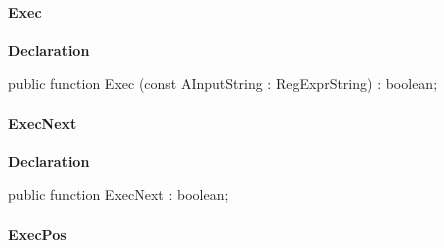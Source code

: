 \documentclass{report}
\newif\ifpdf
\begin{document}
\paragraph*{Exec}\hspace*{\fill}

\label{RegExpr.TRegExpr-Exec}
\begin{list}{}{
\setlength{\itemindent}{0cm}
\setlength{\listparindent}{0cm}
\setlength{\leftmargin}{\evensidemargin}
\addtolength{\leftmargin}{\tmplength}
\settowidth{\labelsep}{X}
\addtolength{\leftmargin}{\labelsep}
\setlength{\labelwidth}{\tmplength}
}
\item[\textbf{Declaration}\hfill]
\ifpdf
\begin{flushleft}
\fi
\begin{ttfamily}
public function Exec (const AInputString : RegExprString) : boolean;\end{ttfamily}

\ifpdf
\end{flushleft}
\fi

\end{list}
\paragraph*{ExecNext}\hspace*{\fill}

\label{RegExpr.TRegExpr-ExecNext}
\begin{list}{}{
\setlength{\itemindent}{0cm}
\setlength{\listparindent}{0cm}
\setlength{\leftmargin}{\evensidemargin}
\addtolength{\leftmargin}{\tmplength}
\settowidth{\labelsep}{X}
\addtolength{\leftmargin}{\labelsep}
\setlength{\labelwidth}{\tmplength}
}
\item[\textbf{Declaration}\hfill]
\ifpdf
\begin{flushleft}
\fi
\begin{ttfamily}
public function ExecNext : boolean;\end{ttfamily}

\ifpdf
\end{flushleft}
\fi

\end{list}
\paragraph*{ExecPos}\hspace*{\fill}
\end{document}
